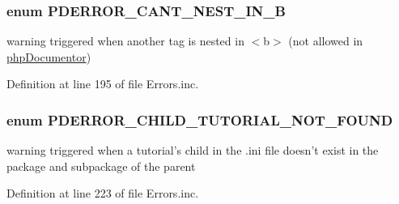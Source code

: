 \hypertarget{_errors_8inc_a05e88712b3200bcabe491651ed72ecac}{
\subsubsection[{\-P\-D\-E\-R\-R\-O\-R\-\_\-\-C\-A\-N\-T\-\_\-\-N\-E\-S\-T\-\_\-\-I\-N\-\_\-\-B}]{\setlength{\rightskip}{0pt plus 5cm}enum {\bf \-P\-D\-E\-R\-R\-O\-R\-\_\-\-C\-A\-N\-T\-\_\-\-N\-E\-S\-T\-\_\-\-I\-N\-\_\-\-B}}}\label{_errors_8inc_a05e88712b3200bcabe491651ed72ecac}
warning triggered when another tag is nested in $<$b$>$ (not allowed in \hyperlink{namespacephp_documentor}{php\-Documentor}) 

\-Definition at line 195 of file \-Errors.\-inc.

\hypertarget{_errors_8inc_a4eae3208f7dd0c7d26890ac528914ca1}{
\subsubsection[{\-P\-D\-E\-R\-R\-O\-R\-\_\-\-C\-H\-I\-L\-D\-\_\-\-T\-U\-T\-O\-R\-I\-A\-L\-\_\-\-N\-O\-T\-\_\-\-F\-O\-U\-N\-D}]{\setlength{\rightskip}{0pt plus 5cm}enum {\bf \-P\-D\-E\-R\-R\-O\-R\-\_\-\-C\-H\-I\-L\-D\-\_\-\-T\-U\-T\-O\-R\-I\-A\-L\-\_\-\-N\-O\-T\-\_\-\-F\-O\-U\-N\-D}}}\label{_errors_8inc_a4eae3208f7dd0c7d26890ac528914ca1}
warning triggered when a tutorial's child in the .ini file doesn't exist in the package and subpackage of the parent 

\-Definition at line 223 of file \-Errors.\-inc.

